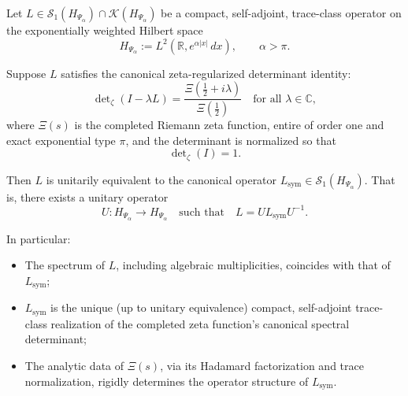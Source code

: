 \begin{theorem}
\label{thm:uniqueness_realization}
Let \( L \in \mathcal{S}_1(H_{\Psi_\alpha}) \cap \mathcal{K}(H_{\Psi_\alpha}) \) be a compact, self-adjoint, trace-class operator on the exponentially weighted Hilbert space
\[
H_{\Psi_\alpha} := L^2(\mathbb{R}, e^{\alpha |x|} \, dx), \qquad \alpha > \pi.
\]

Suppose \( L \) satisfies the canonical zeta-regularized determinant identity:
\[
\det\nolimits_\zeta(I - \lambda L) = \frac{\Xi\left( \tfrac{1}{2} + i\lambda \right)}{\Xi\left( \tfrac{1}{2} \right)}
\quad \text{for all } \lambda \in \mathbb{C},
\]
where \( \Xi(s) \) is the completed Riemann zeta function, entire of order one and exact exponential type \( \pi \), and the determinant is normalized so that
\[
\det\nolimits_\zeta(I) = 1.
\]

Then \( L \) is unitarily equivalent to the canonical operator \( L_{\mathrm{sym}} \in \mathcal{S}_1(H_{\Psi_\alpha}) \). That is, there exists a unitary operator
\[
U \colon H_{\Psi_\alpha} \to H_{\Psi_\alpha} \quad \text{such that} \quad L = U L_{\mathrm{sym}} U^{-1}.
\]

\medskip
\noindent
In particular:
\begin{itemize}
  \item The spectrum of \( L \), including algebraic multiplicities, coincides with that of \( L_{\mathrm{sym}} \);
  \item \( L_{\mathrm{sym}} \) is the unique (up to unitary equivalence) compact, self-adjoint trace-class realization of the completed zeta function’s canonical spectral determinant;
  \item The analytic data of \( \Xi(s) \), via its Hadamard factorization and trace normalization, rigidly determines the operator structure of \( L_{\mathrm{sym}} \).
\end{itemize}
\end{theorem}
